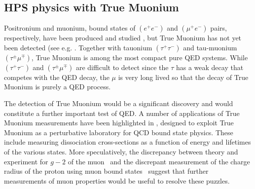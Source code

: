 \subsection{HPS physics with True Muonium}

Positronium and muonium, bound states of $(e^+ e^-)$ and $(\mu^+ e^-)$ pairs, respectively, have been
produced and studied \cite{Deutsch:1951zza,Friedman:1957mz,Hughes:1960zz}, but True Muonium has not yet been 
detected (see e.g. \cite{Holvik:1986ty,ArteagaRomero:2000yh,Brodsky:2009gx,Bilenky:1969zd,Hughes:1971,Malenfant:1987tm,Karshenboim:1998we,Owen:1972,Jentschura:1997ma,Jentschura:1997tv,Karshenboim:1998am}. 
Together with tauonium $(\tau^+ \tau^-)$ and tau-muonium $(\tau^{\pm} \mu^{\mp})$, True Muonium is among the most
compact pure QED systems. While $(\tau^+ \tau^-)$ and $(\tau^{\pm} \mu^{\mp})$ are difficult to detect since the $\tau$ has a
weak decay that competes with the QED decay, the $\mu$ is very long lived so that the decay of True
Muonium is purely a QED process. 

The detection of True Muonium would be a significant discovery and would constitute a further important test of QED.   
A number of applications of True Muonium measurements have been highlighted in 
\cite{Brodsky:2009gx}, designed to exploit True Muonium as a perturbative laboratory 
for QCD bound state physics. 
These include measuring dissociation cross-sections as a function of energy and lifetimes of the various states. 
More speculatively, the discrepancy between theory and experiment for $g-2$ of the muon~\cite{Bennett:2006fi} and the discrepant measurement of
the charge radius of the proton using muon bound states~\cite{Pohl:2010zza} suggest that further measurements of 
muon properties would be useful to resolve these puzzles. 

 
